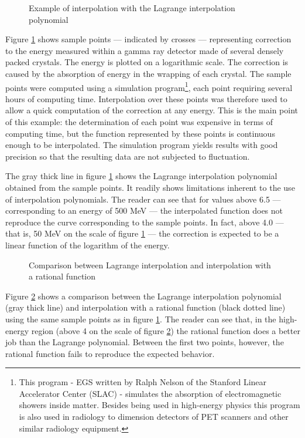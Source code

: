 \documentclass[twoside]{book}
\begin{document}
\begin{figure}
\label{fig:landauinterpol}
\center{}
\caption{Example of interpolation with the Lagrange interpolation
polynomial}
\end{figure}
Figure \ref{fig:landauinterpol} shows sample points --- indicated
by crosses --- representing correction to the energy measured
within a gamma ray detector made of several densely packed
crystals. The energy is plotted on a logarithmic scale. The
correction is caused by the absorption of energy in the wrapping
of each crystal. The sample points were computed using a
simulation program\footnote{This program - EGS written by Ralph
Nelson of the Stanford Linear Accelerator Center (SLAC) -
simulates the absorption of electromagnetic showers inside matter.
Besides being used in high-energy physics this program is also
used in radiology to dimension detectors of PET scanners and other
similar radiology equipment.}, each point requiring several hours
of computing time. Interpolation over these points was therefore
used to allow a quick computation of the correction at any energy.
This is the main point of this example: the determination of each
point was expensive in terms of computing time, but the function
represented by these points is continuous enough to be
interpolated. The simulation program yields results with good
precision so that the resulting data are not subjected to
fluctuation.

The gray thick line in figure \ref{fig:landauinterpol} shows the
Lagrange interpolation polynomial obtained from the sample points.
It readily shows limitations inherent to the use of interpolation
polynomials. The reader can see that for values above 6.5 ---
corresponding to an energy of 500 MeV --- the interpolated
function does not reproduce the curve corresponding to the sample
points. In fact, above 4.0 --- that is,  50 MeV on the scale of
figure \ref{fig:landauinterpol} --- the correction is expected to
be a linear function of the logarithm of the energy.

\begin{figure}
\label{fig:interpolex2}
\center{}
\caption{Comparison between Lagrange interpolation and
interpolation with a rational function}
\end{figure}
Figure \ref{fig:interpolex2} shows a comparison between the
Lagrange interpolation polynomial (gray thick line) and
interpolation with a rational function (black dotted line) using
the same sample points as in figure \ref{fig:landauinterpol}. The
reader can see that, in the high-energy region (above 4 on the
scale of figure \ref{fig:interpolex2}) the rational function does
a better job than the Lagrange polynomial. Between the first two
points, however, the rational function fails to reproduce the
expected behavior.
\end{document}
